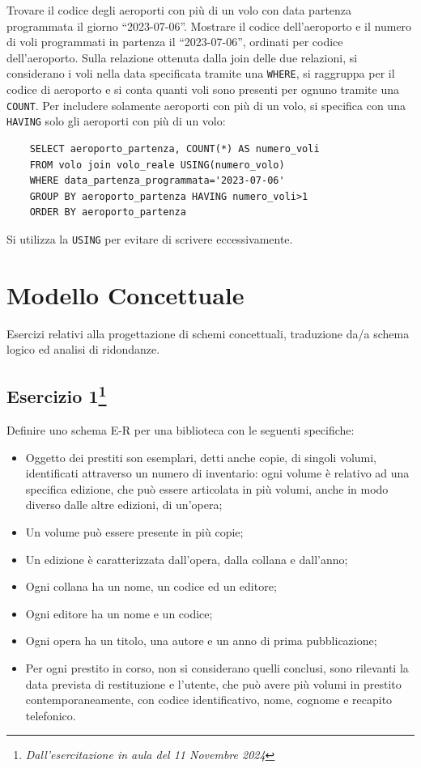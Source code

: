 \documentclass{article}
\begin{document}
Trovare il codice degli aeroporti con più di un volo con data partenza programmata il giorno ``2023-07-06''. Mostrare il codice dell'aeroporto e il numero di voli 
programmati in partenza il ``2023-07-06'', ordinati per codice dell'aeroporto. Sulla relazione ottenuta dalla join delle due relazioni, si considerano i voli nella 
data specificata tramite una \verb|WHERE|, si raggruppa per il codice di aeroporto e si conta quanti voli sono presenti per ognuno tramite una \verb|COUNT|. Per 
includere solamente aeroporti con più di un volo, si specifica con una \verb|HAVING| solo gli aeroporti con più di un volo:

\begin{verbatim}
    SELECT aeroporto_partenza, COUNT(*) AS numero_voli
    FROM volo join volo_reale USING(numero_volo)
    WHERE data_partenza_programmata='2023-07-06'
    GROUP BY aeroporto_partenza HAVING numero_voli>1
    ORDER BY aeroporto_partenza
\end{verbatim}

Si utilizza la \verb|USING| per evitare di scrivere eccessivamente. 

\clearpage

\section{Modello Concettuale}

Esercizi relativi alla progettazione di schemi concettuali, traduzione da/a schema logico ed analisi di ridondanze. 

\subsection{Esercizio 1\footnote{\textit{Dall'esercitazione in aula del 11 Novembre 2024}}}

Definire uno schema E-R per una biblioteca con le seguenti specifiche:
\begin{itemize}
    \item Oggetto dei prestiti son esemplari, detti anche copie, di singoli volumi, identificati attraverso un numero di inventario: ogni volume
è relativo ad una specifica edizione, che può essere articolata in più volumi, anche in modo diverso dalle altre edizioni, di un'opera; 
    \item Un volume può essere presente in più copie;
    \item Un edizione è caratterizzata dall'opera, dalla collana e dall'anno;
    \item Ogni collana ha un nome, un codice ed un editore;
    \item Ogni editore ha un nome e un codice;
    \item Ogni opera ha un titolo, una autore e un anno di prima pubblicazione;
    \item Per ogni prestito in corso, non si considerano quelli conclusi, sono rilevanti la data prevista di restituzione e l'utente, che può avere più volumi in 
prestito contemporaneamente, con codice identificativo, nome, cognome e recapito telefonico. 
\end{itemize}
\end{document}
